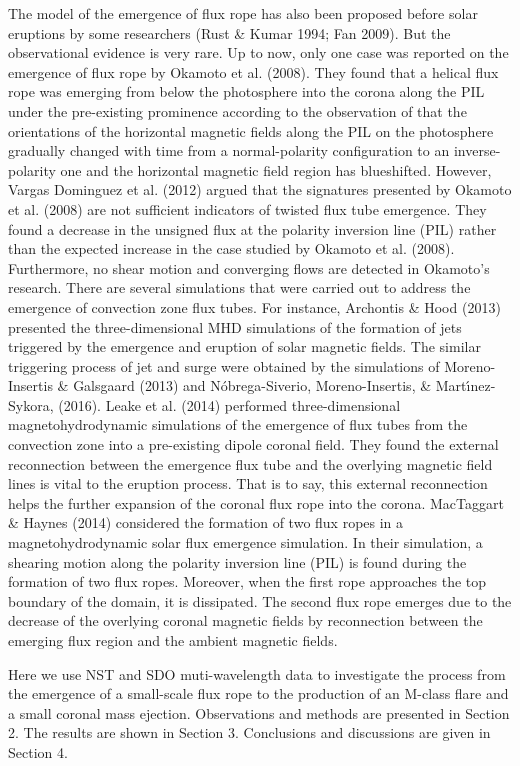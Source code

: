 \documentclass[12pt,preprint]{aastex}
\begin{document}
\begin{CJK*}{UTF8}{gbsn}
The model of the emergence of flux rope has also been proposed before solar eruptions by some researchers (Rust \& Kumar 1994; Fan 2009). But the observational evidence is very rare. Up to now, only one case was reported on the emergence of flux rope by Okamoto et al. (2008). They found that a helical flux rope was emerging from below the photosphere into the corona along the PIL under the pre-existing prominence according to the observation of that the orientations of the horizontal magnetic fields along the PIL on the photosphere gradually changed with time from a normal-polarity configuration to an inverse-polarity one and the horizontal magnetic field region has blueshifted. However, Vargas Dominguez et al. (2012) argued that the signatures presented by Okamoto et al. (2008) are not sufficient indicators of twisted flux tube emergence. They found a decrease in the unsigned flux at the polarity inversion line (PIL) rather than the expected increase in the case studied by Okamoto et al. (2008). Furthermore, no shear motion and converging flows are detected in Okamoto's research. There are several simulations that were carried out to address the emergence of convection zone flux tubes. For instance, Archontis \& Hood (2013) presented the three-dimensional MHD simulations of the formation of jets triggered by the emergence and eruption of solar magnetic fields. The similar triggering process of jet and surge were obtained by the simulations of Moreno-Insertis \& Galsgaard (2013) and N{\'o}brega-Siverio, Moreno-Insertis, \& Mart{\'{\i}}nez-Sykora, (2016). Leake et al. (2014) performed three-dimensional magnetohydrodynamic simulations of the emergence of flux tubes from the convection zone into a pre-existing dipole coronal field. They found the external reconnection between the emergence flux tube and the overlying magnetic field lines is vital to the eruption process. That is to say, this external reconnection helps the further expansion of the coronal flux rope into the corona. MacTaggart \& Haynes (2014) considered the formation of two flux ropes in a magnetohydrodynamic solar flux emergence simulation. In their simulation, a shearing motion along the polarity inversion line (PIL) is found during the formation of two flux ropes. Moreover, when the first rope approaches the top boundary of the domain, it is dissipated. The second flux rope emerges due to the decrease of the overlying coronal magnetic fields by reconnection between the emerging flux region and the ambient magnetic fields.

Here we use NST and SDO muti-wavelength data to investigate the process from the emergence of a small-scale flux rope to the production of an M-class flare and a small coronal mass ejection.  Observations and methods are presented in Section 2. The results are shown in Section 3. Conclusions and discussions are given in Section 4.


\end{CJK*}
\end{document}
